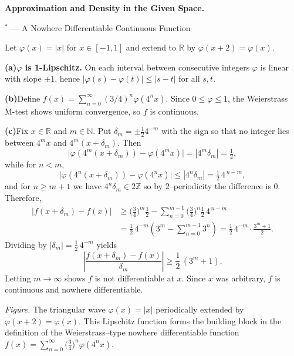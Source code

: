 \begin{problem}[CP-II-0563]
\label{prob:cp-ii-0563}
\textbf{Approximation and Density in the Given Space.}

\hspace*{1.5em}$^\ast$ --- A Nowhere Differentiable Continuous Function

Let $\varphi(x)=|x|$ for $x\in[-1,1]$ and extend to $\mathbb R$ by $\varphi(x+2)=\varphi(x)$.

	\par\smallskip\noindent\textbf{(a)}\quad \textbf{$\varphi$ is 1-Lipschitz.} On each interval between consecutive integers $\varphi$ is linear with slope $\pm1$, hence
	$|\varphi(s)-\varphi(t)|\le|s-t|$ for all $s,t$.
	\par\smallskip\noindent\textbf{(b)}\quad Define $f(x)=\sum_{n=0}^\infty (3/4)^n\varphi(4^n x)$. Since $0\le\varphi\le1$, the Weierstrass M-test shows uniform convergence, so $f$ is continuous.
	\par\smallskip\noindent\textbf{(c)}\quad Fix $x\in\mathbb R$ and $m\in\mathbb N$. Put $\delta_m=\pm \tfrac12 4^{-m}$ with the sign so that no integer lies between $4^m x$ and $4^m(x+\delta_m)$. Then
	\[
	\big|\varphi(4^m(x+\delta_m))-\varphi(4^m x)\big|=|4^m\delta_m|=\tfrac12,
	\]
	while for $n<m$,
	\[
	\big|\varphi(4^n(x+\delta_m))-\varphi(4^n x)\big|\le |4^n\delta_m|=\tfrac12\,4^{\,n-m},
	\]
	and for $n\ge m+1$ we have $4^n\delta_m\in 2\mathbb Z$ so by $2$--periodicity the difference is $0$.
	Therefore,
	\[
	\begin{aligned}
		\big|f(x+\delta_m)-f(x)\big|
		&\ge \Big(\frac{3}{4}\Big)^m\frac12
		- \sum_{n=0}^{m-1}\Big(\frac{3}{4}\Big)^n \frac12\,4^{\,n-m} \\
		&= \frac{1}{2}\,4^{-m}\!\left(3^m-\sum_{n=0}^{m-1}3^n\right)
		= \frac{1}{2}\,4^{-m}\cdot\frac{3^m+1}{2}.
	\end{aligned}
	\]
	Dividing by $|\delta_m|=\tfrac12\,4^{-m}$ yields
	\[
	\left|\frac{f(x+\delta_m)-f(x)}{\delta_m}\right|\ge \frac12\,(3^m+1).
	\]
	Letting $m\to\infty$ shows $f$ is not differentiable at $x$. Since $x$ was arbitrary, $f$ is continuous and nowhere differentiable.

\begin{center}

\end{center}
\noindent
\textit{Figure.} The triangular wave $\varphi(x)=|x|$ periodically extended by
$\varphi(x+2)=\varphi(x)$.  This Lipschitz function forms the building block in the
definition of the Weierstrass--type nowhere differentiable function
$f(x)=\sum_{n=0}^\infty \big(\tfrac34\big)^n \varphi(4^n x)$.
\end{problem}

